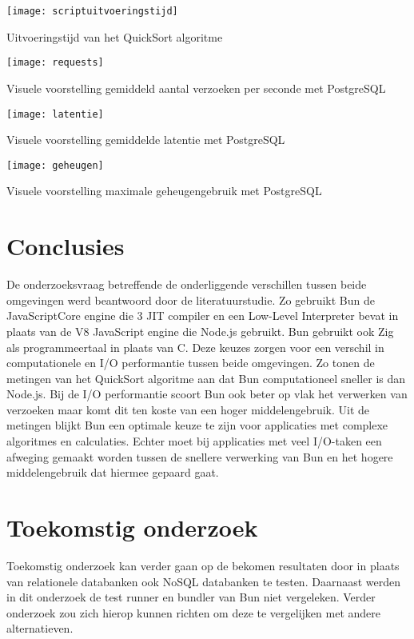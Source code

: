 \documentclass[a0,portrait]{hogent-poster}
\begin{document}
\begin{multicols}{2}
\begin{center}
  \captionsetup{type=figure}
  \begin{minipage}{0.20\textwidth}
    \centering
    \texttt{[image: scriptuitvoeringstijd]}
    \caption{Uitvoeringstijd van het QuickSort algoritme}
  \end{minipage}%
  \hfill
  \begin{minipage}{0.20\textwidth}
    \centering
    \texttt{[image: requests]}
    \caption{Visuele voorstelling gemiddeld aantal verzoeken per seconde met PostgreSQL}
  \end{minipage}%
\end{center}
\begin{center}
  \captionsetup{type=figure}
  \begin{minipage}{0.20\textwidth}
    \centering
    \texttt{[image: latentie]}
    \caption{Visuele voorstelling gemiddelde latentie met PostgreSQL}
  \end{minipage}%
  \hfill
  \begin{minipage}{0.20\textwidth}
    \centering
    \texttt{[image: geheugen]}
    \caption{Visuele voorstelling maximale geheugengebruik met PostgreSQL}
  \end{minipage}
\end{center}

\section{Conclusies}
De onderzoeksvraag betreffende de onderliggende verschillen tussen beide omgevingen werd beantwoord door de literatuurstudie.
Zo gebruikt Bun de JavaScriptCore engine die 3 JIT compiler en een Low-Level Interpreter bevat in plaats van de V8 JavaScript engine die Node.js gebruikt.
Bun gebruikt ook Zig als programmeertaal in plaats van C. Deze keuzes zorgen voor een verschil in computationele en I/O performantie tussen beide omgevingen.
Zo tonen de metingen van het QuickSort algoritme aan dat Bun computationeel sneller is dan Node.js. 
Bij de I/O performantie scoort Bun ook beter op vlak het verwerken van verzoeken maar komt dit ten koste van een hoger middelengebruik.
Uit de metingen blijkt Bun een optimale keuze te zijn voor applicaties met complexe algoritmes en calculaties. 
Echter moet bij applicaties met veel I/O-taken een afweging gemaakt worden tussen de snellere verwerking van Bun en het hogere middelengebruik dat hiermee gepaard gaat.
\section{Toekomstig onderzoek}
Toekomstig onderzoek kan verder gaan op de bekomen resultaten door in plaats van relationele databanken ook NoSQL databanken te testen.
Daarnaast werden in dit onderzoek de test runner en bundler van Bun niet vergeleken. Verder onderzoek zou zich hierop kunnen richten om deze te vergelijken met andere alternatieven.

\end{multicols}
\end{document}
